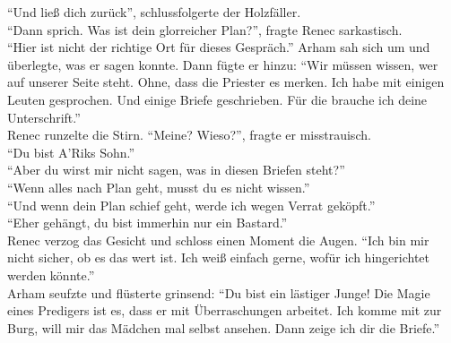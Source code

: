``Und ließ dich zurück'', schlussfolgerte der Holzfäller.\\
``Dann sprich. Was ist dein glorreicher Plan?'', fragte Renec sarkastisch.\\
``Hier ist nicht der richtige Ort für dieses Gespräch.'' Arham sah sich um und überlegte, was er 
sagen konnte. Dann fügte er hinzu: ``Wir müssen wissen, wer auf unserer Seite steht. Ohne, dass 
die Priester es merken. Ich habe mit einigen Leuten gesprochen. Und einige Briefe geschrieben. Für 
die brauche ich deine Unterschrift.''\\
Renec runzelte die Stirn. ``Meine? Wieso?'', fragte er misstrauisch.\\
``Du bist A'Riks Sohn.''\\
``Aber du wirst mir nicht sagen, was in diesen Briefen steht?''\\
``Wenn alles nach Plan geht, musst du es nicht wissen.''\\
``Und wenn dein Plan schief geht, werde ich wegen Verrat geköpft.''\\
``Eher gehängt, du bist immerhin nur ein Bastard.''\\
Renec verzog das Gesicht und schloss einen Moment die Augen. ``Ich bin mir nicht sicher, ob es das 
wert ist. Ich weiß einfach gerne, wofür ich hingerichtet werden könnte.''\\
Arham seufzte und flüsterte grinsend: ``Du bist ein lästiger Junge! Die Magie eines Predigers ist 
es, dass er mit Überraschungen arbeitet. Ich komme mit zur Burg, will mir das Mädchen mal selbst 
ansehen. Dann zeige ich dir die Briefe.''\\

